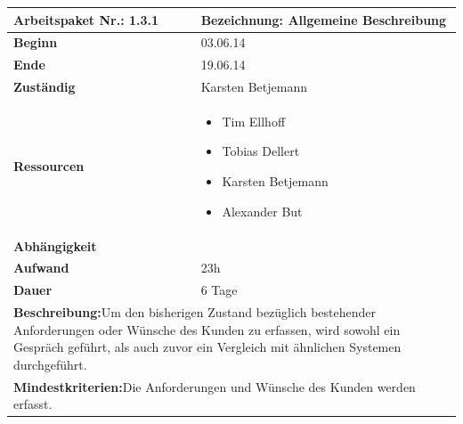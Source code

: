 \documentclass[fontsize=12pt,paper=a4,twoside]{scrartcl}
\begin{document}
\begin{tabular}{|p{5.3cm}|p{9.7cm}|}\hline
	\textbf{Arbeitspaket Nr.:} 1.3.1 & \textbf{Bezeichnung:} Allgemeine Beschreibung\\  \hline \hline
	\textbf{Beginn} & 03.06.14\\ \hline
	\textbf{Ende} & 19.06.14\\ \hline
	\textbf{Zuständig} & Karsten Betjemann\\ \hline
	\textbf{Ressourcen} & \begin{itemize}
		\item Tim Ellhoff
		\item Tobias Dellert
		\item Karsten Betjemann
		\item Alexander But
	\end{itemize}    \\ \hline
	\textbf{Abhängigkeit} & \\ \hline
	\textbf{Aufwand} & 23h \\ \hline
	\textbf{Dauer} & 6 Tage\\ \hline
	\multicolumn{2}{|p{15cm}|}{\textbf{Beschreibung:}\newline Um den bisherigen Zustand bezüglich bestehender Anforderungen oder Wünsche des Kunden zu erfassen, wird sowohl ein Gespräch geführt, als auch zuvor ein Vergleich mit ähnlichen Systemen durchgeführt.   }\\ \hline
	\multicolumn{2}{|p{15cm}|}{\textbf{Mindestkriterien:}\newline Die Anforderungen und Wünsche des Kunden werden erfasst.}\\ \hline
\end{tabular}

\begin{verbatim} 
\end{verbatim}
\end{document}

